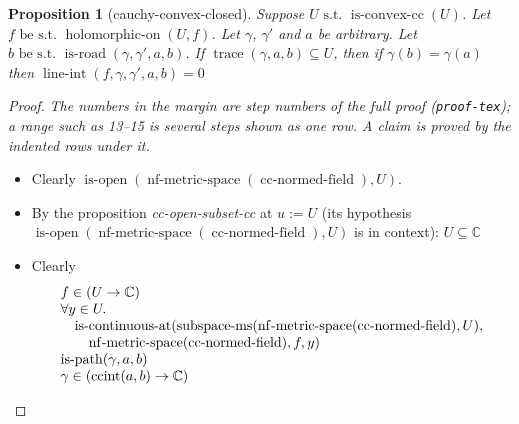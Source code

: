 \documentclass[11pt]{article}
\theoremstyle{plain}
\newtheorem*{proposition*}{Proposition}
\begin{document}
\begin{proposition*}[cauchy-convex-closed]
Suppose $U \text{ s.t. } \operatorname{is\text{-}convex\text{-}cc}(U)$. Let $f \text{ be s.t. } \operatorname{holomorphic\text{-}on}(U, f)$. Let $\gamma$, $\gamma'$ and $a$ be arbitrary. Let $b \text{ be s.t. } \operatorname{is\text{-}road}(\gamma, \gamma', a, b)$. If $\operatorname{trace}(\gamma, a, b) \subseteq U$, then if $\gamma(b) = \gamma(a)$ then  $\operatorname{line\text{-}int}(f, \gamma, \gamma', a, b) = 0$
\end{proposition*}

\begin{proof}
{\small\emph{The numbers in the margin are step numbers of the full proof (\texttt{proof-tex}); a range such as 13--15 is several steps shown as one row.  A claim is proved by the indented rows under it.}}\par\smallskip
\begin{itemize}[leftmargin=2.8em, itemsep=4pt, parsep=1pt]
  \item[\textbf{8}] Clearly $\operatorname{is\text{-}open}(\operatorname{nf\text{-}metric\text{-}space}(\operatorname{cc\text{-}normed\text{-}field}), U)$.
  \item[\textbf{9}] By the proposition \emph{cc-open-subset-cc} at $u := U$ (its hypothesis $\operatorname{is\text{-}open}(\operatorname{nf\text{-}metric\text{-}space}(\operatorname{cc\text{-}normed\text{-}field}), U)$ is in context): $U \subseteq \mathbb{C}$
  \item[\textbf{10--13}] Clearly
\begin{equation*}
\begin{array}{@{}l@{}}
f \in (U \to \mathbb{C}) \\
\begin{array}{@{}l@{}} \forall y \in U. \\ \quad \operatorname{is\text{-}continuous\text{-}at}(\operatorname{subspace\text{-}ms}(\operatorname{nf\text{-}metric\text{-}space}(\operatorname{cc\text{-}normed\text{-}field}), U), \\ \quad \quad \operatorname{nf\text{-}metric\text{-}space}(\operatorname{cc\text{-}normed\text{-}field}), f, y) \end{array} \\
\operatorname{is\text{-}path}(\gamma, a, b) \\
\gamma \in (\operatorname{ccint}(a, b) \to \mathbb{C})
\end{array}
\end{equation*}


\end{itemize}
\end{proof}
\end{document}
